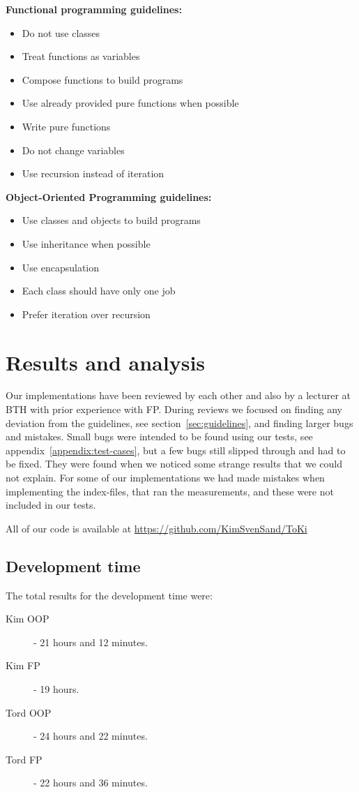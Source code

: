 \documentclass {article}
\begin{document}
\textbf{Functional programming guidelines:}
\begin{itemize}
\item Do not use classes
\item Treat functions as variables
\item Compose functions to build programs
\item Use already provided pure functions when possible
\item Write pure functions
\item Do not change variables
\item Use recursion instead of iteration
\end{itemize}
 
\textbf{Object-Oriented Programming guidelines:}
\begin{itemize}
\item Use classes and objects to build programs
\item Use inheritance when possible
\item Use encapsulation
\item Each class should have only one job
\item Prefer iteration over recursion
\end{itemize}
\newpage
 
\section{Results and analysis}
Our implementations have been reviewed by each other and also by a lecturer at BTH with prior experience with FP. During reviews we focused on finding any deviation from the guidelines, see section~\ref{sec:guidelines}, and finding larger bugs and mistakes. Small bugs were intended to be found using our tests, see appendix~\ref{appendix:test-cases}, but a few bugs still slipped through and had to be fixed. They were found when we noticed some strange results that we could not explain. For some of our implementations we had made mistakes when implementing the index-files, that ran the measurements, and these were not included in our tests.
 
All of our code is available at \url{https://github.com/KimSvenSand/ToKi}
\subsection{Development time}
\label{sec:development-time}
The total results for the development time were:
\begin{description}
\item[Kim OOP] - 21 hours and 12 minutes.
\item[Kim FP] - 19 hours.
\item[Tord OOP] - 24 hours and 22 minutes.
\item[Tord FP] - 22 hours and 36 minutes.
\end{description}
 
\end{document}
